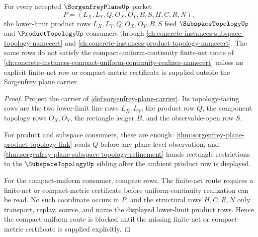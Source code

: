\begin{theorem}
\label{thm:sorgenfrey-plane-compact-uniform-link}
For every accepted $\SorgenfreyPlaneUp$ packet
$$
P=(L_X,L_Y,Q,O_X,O_Y,B,S,H,C,R,N),
$$
the lower-limit product rows $L_X,L_Y,Q,O_X,O_Y,B,S$ feed $\SubspaceTopologyUp$ and $\ProductTopologyUp$ consumers through \autoref{ch:concrete-instances-subspace-topology-namecert} and \autoref{ch:concrete-instances-product-topology-namecert}. The same rows do not satisfy the compact-uniform-continuity finite-net route of \autoref{ch:concrete-instances-compact-uniform-continuity-realizer-namecert} unless an explicit finite-net row or compact-metric certificate is supplied outside the Sorgenfrey plane carrier.
\end{theorem}
\begin{proof}
Project the carrier of \autoref{def:sorgenfrey-plane-carrier}. Its topology-facing rows are the two lower-limit line rows $L_X,L_Y$, the product row $Q$, the component topology rows $O_X,O_Y$, the rectangle ledger $B$, and the observable-open row $S$.

For product and subspace consumers, these are enough: \autoref{thm:sorgenfrey-plane-product-topology-link} reads $Q$ before any plane-level observation, and \autoref{thm:sorgenfrey-plane-subspace-topology-refinement} hands rectangle restrictions to the $\SubspaceTopologyUp$ sibling after the ambient product row is displayed.

For the compact-uniform consumer, compare rows. The finite-net route requires a finite-net or compact-metric certificate before uniform-continuity realization can be read. No such coordinate occurs in $P$, and the structural rows $H,C,R,N$ only transport, replay, source, and name the displayed lower-limit product rows. Hence the compact-uniform route is blocked until the missing finite-net or compact-metric certificate is supplied explicitly.
\end{proof}
